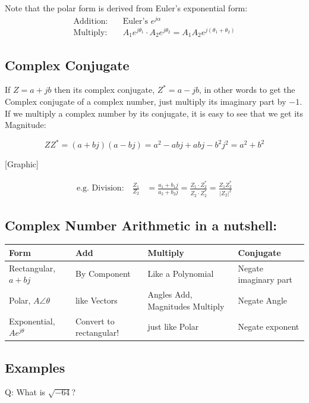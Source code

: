 Note that the polar form is derived from Euler's exponential form:
\begin{align}
\text{Addition:} \quad &\text{Euler's $e^{j\alpha}$} \\
\text{Multiply:} \quad &A_1e^{j\theta_1} \cdot A_2e^{j\theta_2} = A_1A_2e^{j(\theta_1+\theta_2)}
\end{align}



\subsection{Complex Conjugate}
If $Z = a + jb$ then its complex conjugate, $Z^* = a - jb $, in other words to get the Complex conjugate of  a complex
number, just multiply its imaginary part by $-1$.
If we multiply a complex number by its conjugate, it is easy to see that we get its Magnitude:

\[
ZZ^* =  (a+bj)(a-bj) = a^2 - abj + abj - b^2j^2 = a^2 + b^2
\]

[Graphic]


\begin{align}
\text{e.g. Division:} \quad \frac{Z_1}{Z_2} &= \frac{a_1 + b_1j}{a_2 + b_2j} = \frac{Z_1 \cdot Z_2^*}{Z_2 \cdot Z_2^*} = \frac{Z_1Z_2^*}{|Z_2|^2}
\end{align}

\subsection*{Complex Number Arithmetic in a nutshell:}
\begin{tabular}{l|p{}|p{1.0in}|p{1.0in}}
Form                 & Add           & Multiply           & Conjugate \\\hline
Rectangular, $a+bj$  & By Component  & Like a Polynomial  & Negate imaginary part\\ \hline
Polar,
$A\angle{\theta}$    & like Vectors  & Angles Add, Magnitudes Multiply & Negate Angle \\ \hline
Exponential,
$Ae^{j\theta}$       & Convert to rectangular! & just like Polar & Negate exponent
\end{tabular}

\subsection{Examples}

Q: What is $\sqrt{-64}$?

